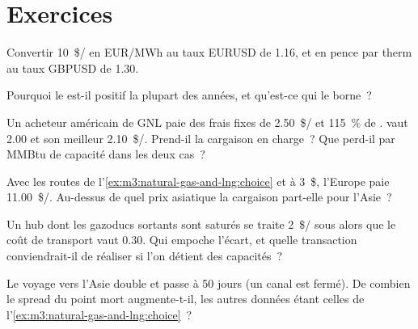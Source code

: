 \section{Exercices}

\begin{exercise}[$\star$]\label{exo:m3:natural-gas-and-lng:1}
Convertir \qty{10}{\$/\mmbtu} en EUR/MWh au taux EURUSD de 1.16, et en pence par therm au
taux GBPUSD de 1.30.
\end{exercise}

\begin{exercise}[$\star$]\label{exo:m3:natural-gas-and-lng:2}
Pourquoi le  est-il positif la plupart des années, et qu'est-ce qui le borne~?
\end{exercise}

\begin{exercise}[$\star$]\label{exo:m3:natural-gas-and-lng:3}
Un acheteur américain de GNL paie des frais fixes de \qty{2.50}{\$/\mmbtu} et 115~\% de . 
vaut \qty{2.00}{} et son meilleur  \qty{2.10}{\$/\mmbtu}. Prend-il la cargaison en charge~? Que perd-il
par MMBtu de capacité dans les deux cas~?
\end{exercise}

\begin{exercise}[$\star\star$]\label{exo:m3:natural-gas-and-lng:4}
Avec les routes de l'\cref{ex:m3:natural-gas-and-lng:choice} et  à 3~\$, l'Europe
paie \qty{11.00}{\$/\mmbtu}. Au-dessus de quel prix asiatique la cargaison part-elle pour l'Asie~?
\end{exercise}

\begin{exercise}[$\star\star$]\label{exo:m3:natural-gas-and-lng:5}
Un hub dont les gazoducs sortants sont saturés se traite \qty{2}{\$/\mmbtu} sous  alors que
le coût de transport vaut \qty{0.30}{}. Qui empoche l'écart, et quelle transaction conviendrait-il de réaliser si
l'on détient des capacités~?
\end{exercise}

\begin{exercise}[$\star\star$]\label{exo:m3:natural-gas-and-lng:6}
Le voyage vers l'Asie double et passe à 50 jours (un canal est fermé). De combien le spread du point mort
augmente-t-il, les autres données étant celles de l'\cref{ex:m3:natural-gas-and-lng:choice}~?
\end{exercise}

